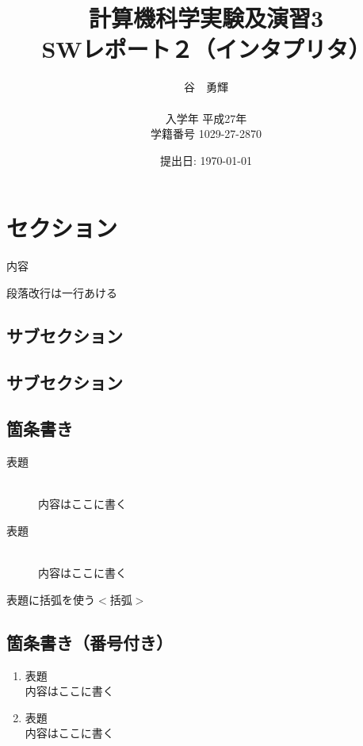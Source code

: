 \documentclass[a4j]{jarticle}
\begin{document}
\title{計算機科学実験及演習3 \\ \bf SWレポート２（インタプリタ）}
\author{谷　勇輝 \\ \\入学年 平成27年 \\ 学籍番号 1029-27-2870}
\date{提出日: \today} %
\maketitle
\newpage






\section{セクション}
内容

段落改行は一行あける
\subsection{サブセクション}
\subsection{サブセクション}

\subsection{箇条書き}
\begin{description}
\item [表題]~\\
内容はここに書く
\item[表題]\mbox{}\\
内容はここに書く
\item[表題に括弧を使う$<$括弧$>$]
\end{description}

\subsection{箇条書き（番号付き）}
\begin{enumerate}
\item 表題　~\\
内容はここに書く 
\item 表題　\mbox{}\\
内容はここに書く 
\end{enumerate}
\end{document}
